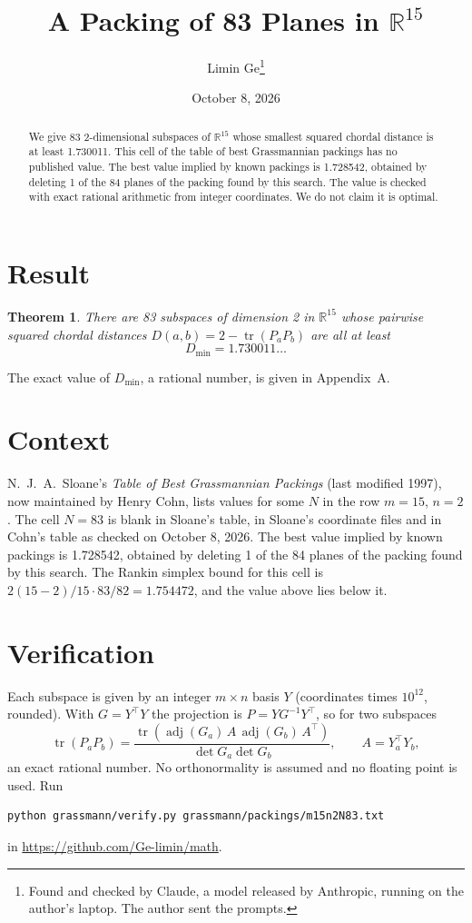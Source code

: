 \documentclass[11pt,a4paper]{article}
\title{A Packing of 83 Planes in $\mathbb{R}^{15}$}
\author{Limin Ge\thanks{Found and checked by Claude, a model released by Anthropic, running on the author's laptop. The author sent the prompts.}}
\date{October 8, 2026}
\newtheorem*{theorem}{Theorem}
\begin{document}
\maketitle
\begin{abstract}
We give 83 2-dimensional subspaces of $\mathbb{R}^{15}$ whose smallest squared chordal distance is at least 1.730011. This cell of the table of best Grassmannian packings has no published value. The best value implied by known packings is 1.728542, obtained by deleting 1 of the 84 planes of the packing found by this search. The value is checked with exact rational arithmetic from integer coordinates. We do not claim it is optimal.
\end{abstract}

\section{Result}
\begin{theorem}
There are 83 subspaces of dimension 2 in $\mathbb{R}^{15}$ whose pairwise squared chordal distances $D(a,b) = 2 - \operatorname{tr}(P_aP_b)$ are all at least
\[ D_{\min} = 1.730011\ldots \]
\end{theorem}
The exact value of $D_{\min}$, a rational number, is given in Appendix~A.


\section{Context}
N.~J.~A.~Sloane's \emph{Table of Best Grassmannian Packings} (last modified 1997), now maintained by Henry Cohn, lists values for some $N$ in the row $m=15$, $n=2$. The cell $N=83$ is blank in Sloane's table, in Sloane's coordinate files and in Cohn's table as checked on October 8, 2026. The best value implied by known packings is 1.728542, obtained by deleting 1 of the 84 planes of the packing found by this search. The Rankin simplex bound for this cell is $2(15-2)/15\cdot 83/82 = 1.754472$, and the value above lies below it.


\section{Verification}
Each subspace is given by an integer $m\times n$ basis $Y$ (coordinates times $10^{12}$, rounded). With $G=Y^\top Y$ the projection is $P=YG^{-1}Y^\top$, so for two subspaces
\[ \operatorname{tr}(P_aP_b)=\frac{\operatorname{tr}(\operatorname{adj}(G_a)\,A\,\operatorname{adj}(G_b)\,A^\top)}{\det G_a\det G_b},\qquad A=Y_a^\top Y_b, \]
an exact rational number. No orthonormality is assumed and no floating point is used. Run
\begin{verbatim}
python grassmann/verify.py grassmann/packings/m15n2N83.txt
\end{verbatim}
in \url{https://github.com/Ge-limin/math}.
\end{document}
